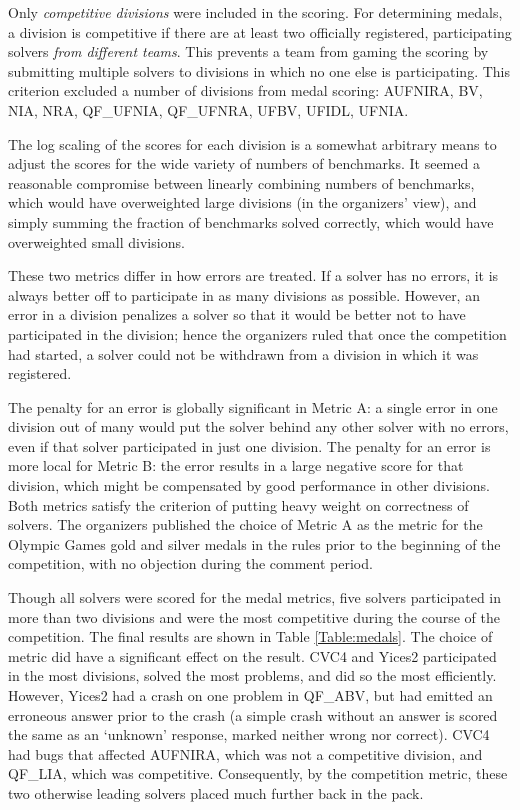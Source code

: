 \documentclass[twoside,11pt]{article}
\begin{document}
Only \emph{competitive divisions} were included in the scoring. For determining medals, a division is competitive if there are at least two officially registered, participating solvers \emph{from different teams}. This prevents a team from gaming the scoring by submitting multiple solvers to divisions in which no one else is participating. This criterion excluded a number of divisions from medal scoring: AUFNIRA, BV, NIA, NRA, QF\_UFNIA, QF\_UFNRA, UFBV, UFIDL, UFNIA.

The log scaling of the scores for each division is a somewhat arbitrary means to adjust the scores for the wide variety of numbers of benchmarks. It seemed a reasonable compromise between linearly combining numbers of benchmarks, which would have overweighted large divisions (in the organizers' view), and simply summing the fraction of benchmarks solved correctly, which would have overweighted small divisions.

These two metrics differ in how errors are treated. If a solver has no errors, it is always better off to participate in as many divisions as possible. However, an error in a division penalizes a solver so that it would be better not to have participated in the division; hence the organizers ruled that once the competition had started, a solver could not be withdrawn from a division in which it was registered.

The penalty for an error is globally significant in Metric A: a single error in one division out of many would put the solver behind any other solver with no errors, even if that solver participated in just one division. The penalty for an error is more local for Metric B: the error results in a large negative score for that division, which might be compensated by good performance in other divisions. Both metrics satisfy the criterion of putting heavy weight on correctness of solvers.
The organizers published the choice of Metric A as the metric for the Olympic Games gold and silver medals in the rules prior to the beginning of the competition, with no objection during the comment period.

Though all solvers were scored for the medal metrics, five solvers participated in more than two divisions and were the most competitive during the course of the competition. The final results are shown in Table \ref{Table:medals}. The choice of metric did have a significant effect on the result. CVC4 and Yices2 participated in the most divisions, solved the most problems, and did so the most efficiently. However, Yices2 had a crash on one problem in QF\_ABV, but had emitted an erroneous answer prior to the crash (a simple crash without an answer is scored the same as an `unknown' response, marked neither wrong nor correct). CVC4 had bugs that affected AUFNIRA, which was not a competitive division, and QF\_LIA,
which was competitive. Consequently, by the competition metric, these two otherwise leading solvers placed much further back in the pack.
\end{document}
